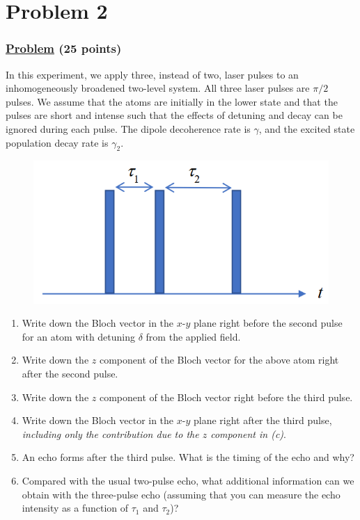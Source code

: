\documentclass[12pt]{article}
\begin{document}
\section*{Problem 2}
\subsubsection*{\underline{Problem} (25 points)}
In this experiment, we apply three, instead of two, laser pulses to an inhomogeneously broadened two-level system.
All three laser pulses are $\pi/2$ pulses.
We assume that the atoms are initially in the lower state and that the pulses are short and intense such that the effects of detuning and decay can be ignored during each pulse.
The dipole decoherence rate is $\gamma$, and the excited state population decay rate is $\gamma_2$.
\begin{figure}[h]
    \centering
    \includegraphics[scale=.75]{spin_echo.png}
\end{figure}
\begin{enumerate}[label=(\alph*)]
    \item Write down the Bloch vector in the $x$-$y$ plane right before the second pulse for an atom with detuning $\delta$ from the applied field.
    \item Write down the $z$ component of the Bloch vector for the above atom right after the second pulse.
    \item Write down the $z$ component of the Bloch vector right before the third pulse.
    \item Write down the Bloch vector in the $x$-$y$ plane right after the third pulse, \textit{including only the contribution due to the $z$ component in (c)}.
    \item An echo forms after the third pulse. What is the timing of the echo and why?
    \item Compared with the usual two-pulse echo, what additional information can we obtain with the three-pulse echo (assuming that you can measure the echo intensity as a function of $\tau_1$ and $\tau_2$)?
\end{enumerate}
\end{document}
